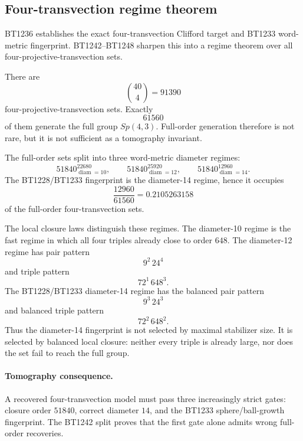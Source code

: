 \subsection{Four-transvection regime theorem}
\label{sec:bt1249-four-transvection-regimes}

BT1236 establishes the exact four-transvection Clifford target and BT1233 word-metric fingerprint.  BT1242--BT1248 sharpen this into a regime theorem over all four-projective-transvection sets.

There are
\[
\binom{40}{4}=91390
\]
four-projective-transvection sets.  Exactly
\[
61560
\]
of them generate the full group \(Sp(4,3)\).  Full-order generation therefore is not rare, but it is not sufficient as a tomography invariant.

The full-order sets split into three word-metric diameter regimes:
\[
51840_{\operatorname{diam}=10}^{22680},
\qquad
51840_{\operatorname{diam}=12}^{25920},
\qquad
51840_{\operatorname{diam}=14}^{12960}.
\]
The BT1228/BT1233 fingerprint is the diameter-14 regime, hence it occupies
\[
\frac{12960}{61560}=0.2105263158
\]
of the full-order four-transvection sets.

The local closure laws distinguish these regimes.  The diameter-10 regime is the fast regime in which all four triples already close to order \(648\).  The diameter-12 regime has pair pattern
\[
9^2\,24^4
\]
and triple pattern
\[
72^1\,648^3.
\]
The BT1228/BT1233 diameter-14 regime has the balanced pair pattern
\[
9^3\,24^3
\]
and balanced triple pattern
\[
72^2\,648^2.
\]
Thus the diameter-14 fingerprint is not selected by maximal stabilizer size.  It is selected by balanced local closure: neither every triple is already large, nor does the set fail to reach the full group.

\paragraph{Tomography consequence.}
A recovered four-transvection model must pass three increasingly strict gates: closure order \(51840\), correct diameter \(14\), and the BT1233 sphere/ball-growth fingerprint.  The BT1242 split proves that the first gate alone admits wrong full-order recoveries.
